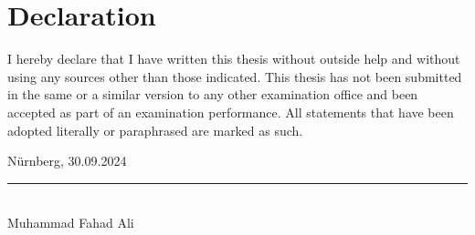 \chapter*{Declaration}
\thispagestyle{empty}
I hereby declare that I have written this thesis without outside help and without using any sources other than those indicated. This thesis has not been submitted in the same or a similar version to any other examination office and been accepted as part of an examination performance. All statements that have been adopted literally or paraphrased are marked as such.\\
\vspace{1.5cm}

Nürnberg, 30.09.2024\\[-5mm]
\hspace*{10.4cm}\rule[-0.3pt]{0.35\linewidth}{0.4pt}\\[0mm]
\hspace*{11.5cm}Muhammad Fahad Ali

\thispagestyle{empty}
\mbox{ }
\newpage